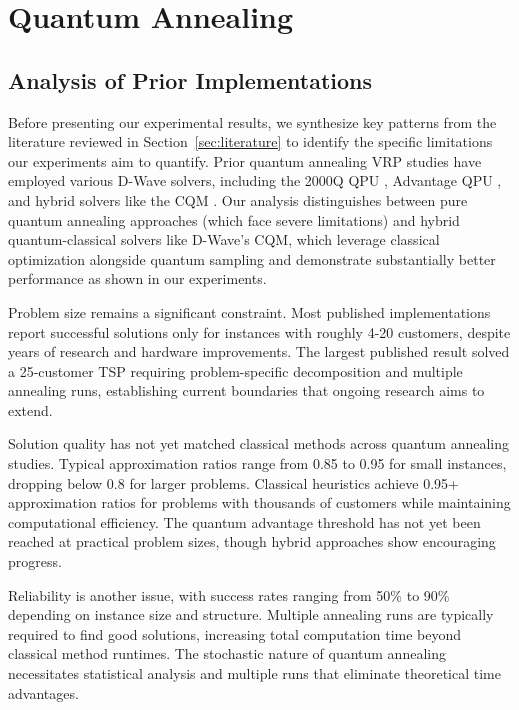 \documentclass[preprint,3p,12pt,authoryear]{elsarticle}
\begin{document}
\section{Quantum Annealing}\label{sec:annealing}

\subsection{Analysis of Prior Implementations}

Before presenting our experimental results, we synthesize key patterns from the literature reviewed in Section~\ref{sec:literature} to identify the specific limitations our experiments aim to quantify. Prior quantum annealing VRP studies have employed various D-Wave solvers, including the 2000Q QPU \citep{borowski2020new}, Advantage QPU \citep{jain2021solving}, and hybrid solvers like the CQM \citep{osaba2024solving}. Our analysis distinguishes between pure quantum annealing approaches (which face severe limitations) and hybrid quantum-classical solvers like D-Wave's CQM, which leverage classical optimization alongside quantum sampling and demonstrate substantially better performance as shown in our experiments.

Problem size remains a significant constraint. Most published implementations report successful solutions only for instances with roughly 4-20 customers, despite years of research and hardware improvements. The largest published result solved a 25-customer TSP requiring problem-specific decomposition and multiple annealing runs, establishing current boundaries that ongoing research aims to extend.

Solution quality has not yet matched classical methods across quantum annealing studies. Typical approximation ratios range from 0.85 to 0.95 for small instances, dropping below 0.8 for larger problems. Classical heuristics achieve 0.95+ approximation ratios for problems with thousands of customers while maintaining computational efficiency. The quantum advantage threshold has not yet been reached at practical problem sizes, though hybrid approaches show encouraging progress.

Reliability is another issue, with success rates ranging from 50\% to 90\% depending on instance size and structure. Multiple annealing runs are typically required to find good solutions, increasing total computation time beyond classical method runtimes. The stochastic nature of quantum annealing necessitates statistical analysis and multiple runs that eliminate theoretical time advantages.
\end{document}
